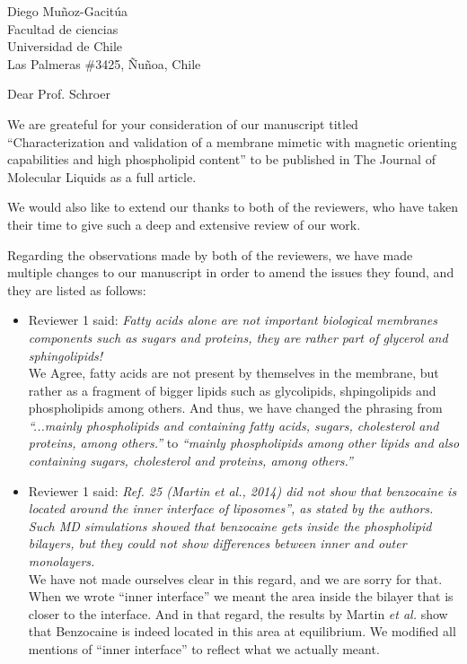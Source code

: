 \documentclass{letter}
\begin{document}
\begin{letter}{Diego Muñoz-Gacitúa\\ Facultad de ciencias \\ Universidad de
    Chile \\ Las Palmeras \#3425, Ñuñoa, Chile}
  
  \opening{Dear Prof. Schroer}
  
  We are greateful for your consideration of our manuscript titled
  ``Characterization and validation of a membrane mimetic with magnetic
  orienting capabilities and high phospholipid content'' to be published in The
  Journal of Molecular Liquids as a full article.
  
  We would also like to extend our thanks to both of the reviewers, who have
  taken their time to give such a deep and extensive review of our work.
  
  Regarding the observations made by both of the reviewers, we have made multiple changes to
  our manuscript in order to amend the issues they found, and they are listed as
  follows:
  
  \begin{itemize}
  \item Reviewer 1 said: \textit{Fatty acids alone are not important biological membranes components such as sugars and proteins, they are rather part of glycerol and sphingolipids!}\\
    We Agree, fatty acids are not present by themselves in the membrane, but
    rather as a fragment of bigger lipids such as glycolipids, shpingolipids and
    phospholipids among others. And thus, we have changed the phrasing from
    \textit{``...mainly phospholipids and containing fatty acids, sugars,
      cholesterol and proteins, among others.''} to \textit{``mainly phospholipids among other lipids and
      also containing sugars, cholesterol and proteins, among others.''}
    
  \item Reviewer 1 said: \textit{Ref. 25 (Martin et al., 2014) did not show that benzocaine is located around the inner interface of liposomes”, as stated by the authors. Such MD simulations showed that benzocaine gets inside the phospholipid bilayers, but they could not show differences between inner and outer monolayers.}\\
    We have not made ourselves clear in this regard, and we are sorry for that. When we wrote ``inner
    interface'' we meant the area inside the bilayer that is closer to the
    interface. And in that regard, the results by Martin \textit{et al.} show
    that Benzocaine is indeed located in this area at equilibrium. We modified
    all mentions of ``inner interface'' to reflect what we actually meant.
    

\end{itemize}
\end{letter}
\end{document}
